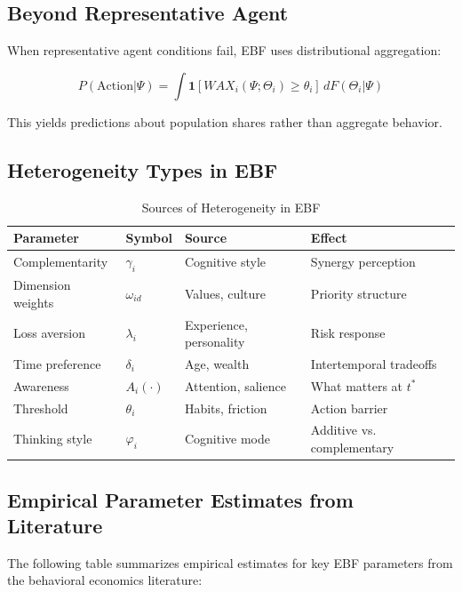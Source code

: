\subsection{Beyond Representative Agent}

When representative agent conditions fail, EBF uses distributional aggregation:

\begin{equation}
P(\text{Action} | \Psi) = \int \mathbf{1}[WAX_i(\Psi; \Theta_i) \geq \theta_i] \, dF(\Theta_i | \Psi)
\end{equation}

This yields predictions about population shares rather than aggregate behavior.

\subsection{Heterogeneity Types in EBF}

\begin{table}[htbp]
\centering
\caption{Sources of Heterogeneity in EBF}
\label{tab:az-heterogeneity}
\renewcommand{\arraystretch}{1.3}
\begin{tabular}{@{}llll@{}}
\toprule
\textbf{Parameter} & \textbf{Symbol} & \textbf{Source} & \textbf{Effect} \\
\midrule
Complementarity & $\gamma_i$ & Cognitive style & Synergy perception \\
Dimension weights & $\omega_{id}$ & Values, culture & Priority structure \\
Loss aversion & $\lambda_i$ & Experience, personality & Risk response \\
Time preference & $\delta_i$ & Age, wealth & Intertemporal tradeoffs \\
Awareness & $A_i(\cdot)$ & Attention, salience & What matters at $t^*$ \\
Threshold & $\theta_i$ & Habits, friction & Action barrier \\
Thinking style & $\varphi_i$ & Cognitive mode & Additive vs. complementary \\
\bottomrule
\end{tabular}
\end{table}

\subsection{Empirical Parameter Estimates from Literature}

The following table summarizes empirical estimates for key EBF parameters
from the behavioral economics literature:

